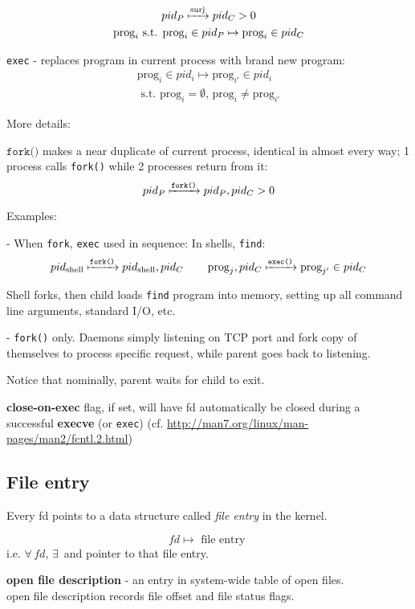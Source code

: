 \documentclass[10pt]{amsart}
\begin{document}
\begin{multicols*}{2}
\[
\begin{gathered}
	pid_P \xmapsto{\text{surj}} pid_C > 0 \\
	\text{prog}_i \text{ s.t. } \text{prog}_i \in pid_P \mapsto \text{prog}_i \in pid_C 
\end{gathered}
\]

\texttt{exec} - replaces program in current process with brand new program:
\[
\begin{gathered}
\text{prog}_i \in pid_i \mapsto \text{prog}_{i'} \in pid_i \\
\text{ s.t. } \text{prog}_i = \emptyset, \, \text{prog}_i \neq \text{prog}_{i'}
\end{gathered}
\]

More details:

$\texttt{fork()}$ makes a near duplicate of current process, identical in almost every way; 1 process calls \texttt{fork()} while 2 processes return from it:
\[
pid_P \xmapsto{\texttt{fork()}} pid_P, pid_C >0
\]

Examples:

- When \texttt{fork}, \texttt{exec} used in sequence: 
In shells, \texttt{find}: 
\[
pid_{\text{shell}} \xmapsto{\texttt{fork()}} pid_{\text{shell}}, pid_C \qquad \, \text{prog}_j, pid_C \xmapsto{\texttt{exec()}} \text{prog}_{j'} \in pid_C
\] 

Shell forks, then child loads \texttt{find} program into memory, setting up all command line arguments, standard I/O, etc.

- \texttt{fork()} only.
Daemons simply listening on TCP port and fork copy of themselves to process specific request, while parent goes back to listening. 

Notice that nominally, parent waits for child to exit. 

\textbf{close-on-exec} flag, if set, will have fd automatically be closed during a successful \textbf{execve} (or \texttt{exec}) (cf. \url{http://man7.org/linux/man-pages/man2/fcntl.2.html})

\subsection{File entry}

Every fd points to a data structure called \emph{file entry} in the kernel.

\[
fd \mapsto \text{ file entry }
\]
i.e. $\forall \, fd$, $\exists \,$  and pointer to that file entry.


\textbf{open file description} - an entry in system-wide table of open files. \\
open file description records file offset and file status flags.


\end{multicols*}
\end{document}
